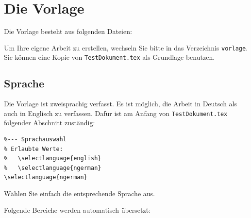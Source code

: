 \documentclass[pdftex,a4paper]{scrartcl}
\begin{document}
\clearpage
\section{Die Vorlage}

Die Vorlage besteht aus folgenden Dateien:


Um Ihre eigene Arbeit zu erstellen, wechseln Sie bitte in das Verzeichnis
\texttt{vorlage}.
Sie können eine Kopie von \texttt{TestDokument.tex} als Grundlage benutzen.

\subsection{Sprache}
\label{sec:sprache}

Die Vorlage ist zweisprachig verfasst. 
Es ist möglich, die Arbeit in Deutsch als auch in Englisch zu verfassen.
Dafür ist am Anfang von \texttt{TestDokument.tex} folgender Abschnitt zuständig:

\begin{verbatim}
%--- Sprachauswahl
% Erlaubte Werte:
%   \selectlanguage{english}
%   \selectlanguage{ngerman}
\selectlanguage{ngerman}
\end{verbatim}

Wählen Sie einfach die entsprechende Sprache aus.

Folgende Bereiche werden automatisch übersetzt:
\end{document}
